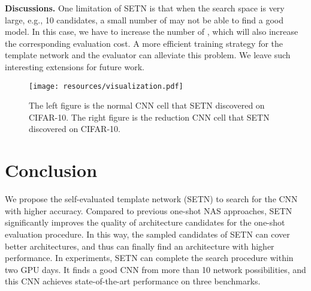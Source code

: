 \documentclass[10pt,twocolumn,letterpaper]{article}
\def\NAME{{SETN}}
\begin{document}
\textbf{Discussions.}
One limitation of {\NAME} is that when the search space is very large, e.g., 10 candidates, a small number of  may not be able to find a good model. In this case, we have to increase the number of , which will also increase the corresponding evaluation cost.
A more efficient training strategy for the template network and the evaluator can alleviate this problem.
We leave such interesting extensions for future work.




\begin{figure}[t!]
\begin{center}
\texttt{[image: resources/visualization.pdf]}
\end{center}
\caption[Captioning]{
The left figure is the normal CNN cell that {\NAME} discovered on CIFAR-10.
The right figure is the reduction CNN cell that {\NAME} discovered on CIFAR-10.
}
\vspace{-2mm}
\label{fig:visualization}
\end{figure}






\section{Conclusion}

We propose the self-evaluated template network ({\NAME}) to search for the CNN with higher accuracy.
Compared to previous one-shot NAS approaches, {\NAME} significantly improves the quality of architecture candidates for the one-shot evaluation procedure. In this way, the sampled candidates of {\NAME} can cover better architectures, and thus can finally find an architecture with higher performance.
In experiments, {\NAME} can complete the search procedure within two GPU days. It finds a good CNN from more than 10 network possibilities, and this CNN achieves state-of-the-art performance on three benchmarks.














{\small


}
\end{document}
